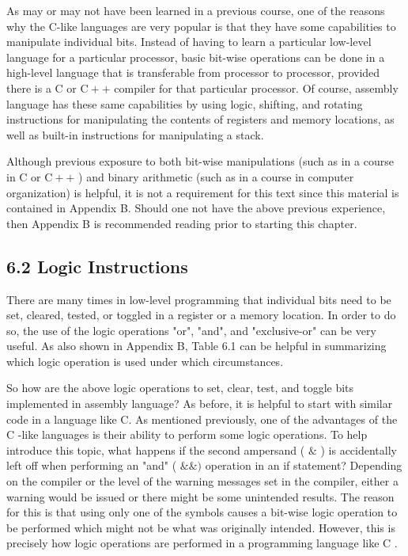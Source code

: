 \documentclass[10pt]{article}
\begin{document}
As may or may not have been learned in a previous course, one of the reasons why the C-like languages are very popular is that they have some capabilities to manipulate individual bits. Instead of having to learn a particular low-level language for a particular processor, basic bit-wise operations can be done in a high-level language that is transferable from processor to processor, provided there is a C or $\mathrm{C}++$ compiler for that particular processor. Of course, assembly language has these same capabilities by using logic, shifting, and rotating instructions for manipulating the contents of registers and memory locations, as well as built-in instructions for manipulating a stack.

Although previous exposure to both bit-wise manipulations (such as in a course in C or $\mathrm{C}++$ ) and binary arithmetic (such as in a course in computer organization) is helpful, it is not a requirement for this text since this material is contained in Appendix B. Should one not have the above previous experience, then Appendix B is recommended reading prior to starting this chapter.

\subsection*{6.2 Logic Instructions}
There are many times in low-level programming that individual bits need to be set, cleared, tested, or toggled in a register or a memory location. In order to do so, the use of the logic operations "or", "and", and "exclusive-or" can be very useful. As also shown in Appendix B, Table 6.1 can be helpful in summarizing which logic operation is used under which circumstances.

So how are the above logic operations to set, clear, test, and toggle bits implemented in assembly language? As before, it is helpful to start with similar code in a language like C. As mentioned previously, one of the advantages of the C -like languages is their ability to perform some logic operations. To help introduce this topic, what happens if the second ampersand ( $\&$ ) is accidentally left off when performing an "and" ( $\& \&)$ operation in an if statement? Depending on the compiler or the level of the warning messages set in the compiler, either a warning would be issued or there might be some unintended results. The reason for this is that using only one of the symbols causes a bit-wise logic operation to be performed which might not be what was originally intended. However, this is precisely how logic operations are performed in a programming language like C .
\end{document}
